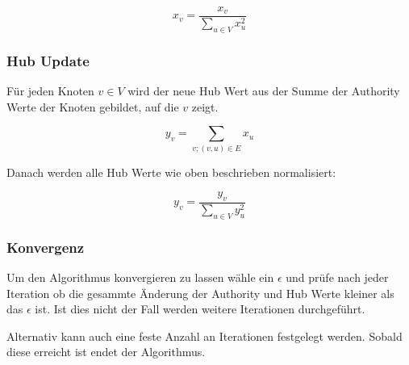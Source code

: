\[ x_{v} =  \frac{x_{v}}{\sum_{u \in V} x_{u}^{2}} \]

\subsubsection{Hub Update}

Für jeden Knoten $ v \in V $ wird der neue Hub Wert aus der Summe der Authority Werte der Knoten gebildet, auf die $v$ zeigt.

\[ y_{v} = \sum_{v; (v, u) \in E} x_{u} \]

Danach werden alle Hub Werte wie oben beschrieben normalisiert:

\[ y_{v} =  \frac{y_{v}}{\sum_{u \in V} y_{u}^{2}} \]

\subsubsection{Konvergenz}

Um den Algorithmus konvergieren zu lassen wähle ein $ \epsilon $ und prüfe nach jeder Iteration ob die gesammte Änderung der Authority
und Hub Werte kleiner als das $ \epsilon $ ist. Ist dies nicht der Fall werden weitere Iterationen durchgeführt.


Alternativ kann auch eine feste Anzahl an Iterationen festgelegt werden. Sobald diese erreicht ist endet der Algorithmus.

